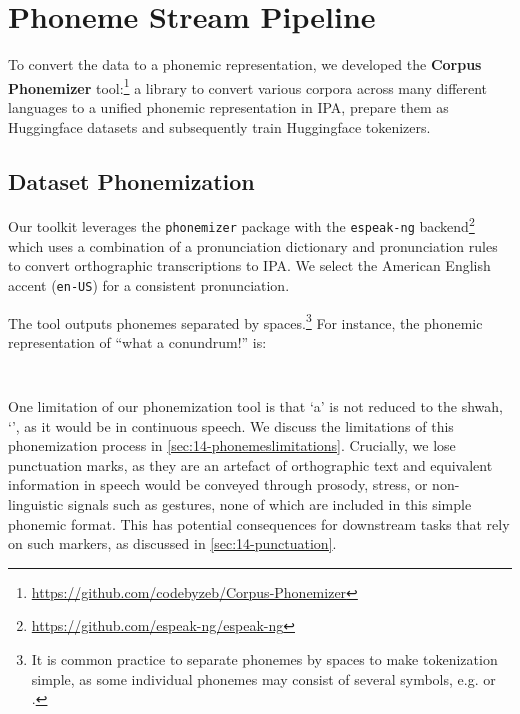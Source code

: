 
\section{Phoneme Stream Pipeline}
\label{sec:14-pipeline}

To convert the data to a phonemic representation, we developed the \textbf{Corpus Phonemizer} tool:\footnote{\url{https://github.com/codebyzeb/Corpus-Phonemizer}} a library to convert various corpora across many different languages to a unified phonemic representation in IPA, prepare them as Huggingface datasets and subsequently train Huggingface tokenizers.

\subsection{Dataset Phonemization}

Our toolkit leverages the \texttt{phonemizer} package \citep{Bernard2021} with the \texttt{espeak-ng} backend\footnote{\url{https://github.com/espeak-ng/espeak-ng}} which uses a combination of a pronunciation dictionary and pronunciation rules to convert orthographic transcriptions to IPA. We select the American English accent (\texttt{en-US}) for a consistent pronunciation. 

The tool outputs phonemes separated by spaces.\footnote{It is common practice to separate phonemes by spaces to make tokenization simple, as some individual phonemes may consist of several symbols, e.g.  or .} For instance, the phonemic representation of ``what a conundrum!'' is:

\vspace{-2mm}
\begin{center}
\texttt{ \textvisiblespace~ \textvisiblespace~ \textvisiblespace~}
\end{center}
\vspace{-1mm}

\noindent
One limitation of our phonemization tool is that `a' is not reduced to the shwah, `', as it would be in continuous speech. We discuss the limitations of this phonemization process in \cref{sec:14-phonemeslimitations}. Crucially, we lose punctuation marks, as they are an artefact of orthographic text and equivalent information in speech would be conveyed through prosody, stress, or non-linguistic signals such as gestures, none of which are included in this simple phonemic format. This has potential consequences for downstream tasks that rely on such markers, as discussed in \cref{sec:14-punctuation}.

